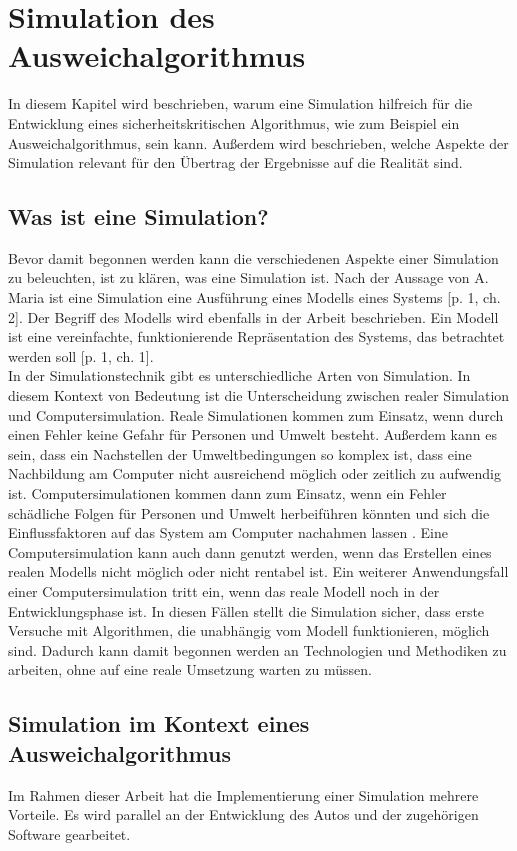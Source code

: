 \section{Simulation des Ausweichalgorithmus}

In diesem Kapitel wird beschrieben, warum eine Simulation hilfreich für die Entwicklung eines 
sicherheitskritischen Algorithmus, wie zum Beispiel ein Ausweichalgorithmus, sein kann.
Außerdem wird beschrieben, welche Aspekte der Simulation relevant für den Übertrag der Ergebnisse auf die Realität sind.

\subsection{Was ist eine Simulation?}
\label{Simulation}
Bevor damit begonnen werden kann die verschiedenen Aspekte einer Simulation zu beleuchten, ist zu klären, was eine Simulation ist.
Nach der Aussage von A. Maria ist eine Simulation eine Ausführung eines Modells eines Systems \cite{maria1997introduction}[p. 1, ch. 2].
Der Begriff des Modells wird ebenfalls in der Arbeit beschrieben. 
Ein Modell ist eine vereinfachte, funktionierende Repräsentation des Systems, das betrachtet werden soll \cite{maria1997introduction}[p. 1, ch. 1].\\
In der Simulationstechnik gibt es unterschiedliche Arten von Simulation. 
In diesem Kontext von Bedeutung ist die Unterscheidung zwischen realer Simulation und Computersimulation. 
Reale Simulationen kommen zum Einsatz, wenn durch einen Fehler keine Gefahr für Personen und Umwelt besteht.
Außerdem kann es sein, dass ein Nachstellen der Umweltbedingungen so komplex ist, dass eine Nachbildung am Computer nicht ausreichend möglich oder zeitlich zu aufwendig ist. 
Computersimulationen kommen dann zum Einsatz, wenn ein Fehler schädliche Folgen für Personen und Umwelt herbeiführen könnten und sich die Einflussfaktoren auf das System am Computer nachahmen lassen \cite{Britannica2023}. 
Eine Computersimulation kann auch dann genutzt werden, wenn das Erstellen eines realen Modells nicht möglich oder nicht rentabel ist. 
Ein weiterer Anwendungsfall einer Computersimulation tritt ein, wenn das reale Modell noch in der Entwicklungsphase ist. 
In diesen Fällen stellt die Simulation sicher, dass erste Versuche mit Algorithmen, die unabhängig vom Modell funktionieren, möglich sind. 
Dadurch kann damit begonnen werden an Technologien und Methodiken zu arbeiten, ohne auf eine reale Umsetzung warten zu müssen.

\newpage
\subsection{Simulation im Kontext eines Ausweichalgorithmus}
Im Rahmen dieser Arbeit hat die Implementierung einer Simulation mehrere Vorteile. 
Es wird parallel an der Entwicklung des Autos und der zugehörigen Software gearbeitet.

